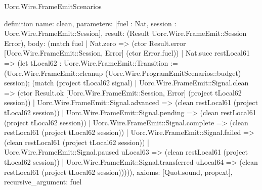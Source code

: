 \begin{lexlean}{Uorc.Wire.FrameEmitScenarios}
\begin{semanticmodule}
definition{
  name: clean,
  parameters: [fuel : Nat, session : Uorc.Wire.FrameEmit::Session],
  result: (Result Uorc.Wire.FrameEmit::Session Error),
  body: (match fuel
    | Nat.zero => (ctor Result.error [Uorc.Wire.FrameEmit::Session, Error] (ctor Error.fuel))
    | Nat.succ restLocal61 => (let tLocal62 : Uorc.Wire.FrameEmit::Transition := (Uorc.Wire.FrameEmit::cleanup (Uorc.Wire.ProgramEmitScenarios::budget) session); (match (project tLocal62 signal)
      | Uorc.Wire.FrameEmit::Signal.clean => (ctor Result.ok [Uorc.Wire.FrameEmit::Session, Error] (project tLocal62 session))
      | Uorc.Wire.FrameEmit::Signal.advanced => (clean restLocal61 (project tLocal62 session))
      | Uorc.Wire.FrameEmit::Signal.pending => (clean restLocal61 (project tLocal62 session))
      | Uorc.Wire.FrameEmit::Signal.complete => (clean restLocal61 (project tLocal62 session))
      | Uorc.Wire.FrameEmit::Signal.failed => (clean restLocal61 (project tLocal62 session))
      | Uorc.Wire.FrameEmit::Signal.paused uLocal63 => (clean restLocal61 (project tLocal62 session))
      | Uorc.Wire.FrameEmit::Signal.transferred uLocal64 => (clean restLocal61 (project tLocal62 session))))),
  axioms: [Quot.sound, propext],
  recursive_argument: fuel
}


\end{semanticmodule}
\end{lexlean}
